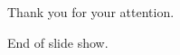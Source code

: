\documentclass{slides}
\begin{document}



\begin{slide}

\medskip

Thank you for your attention.

\medskip

End of slide show.

\medskip

\end{slide}



\end{document}
